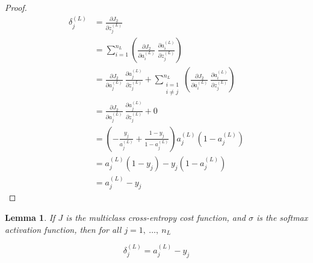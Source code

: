 \documentclass{article}[11pt]
\newtheorem{lemma}{Lemma}
\begin{document}
\begin{proof}
            $$ \begin{aligned}
            \delta^{(L)}_j &= \frac{\partial J_2}{\partial z^{(L)}_j} \\
            &= \sum_{i=1}^{n_L} \left( \frac{\partial J_2}{\partial a^{(L)}_i} \ \frac{\partial a^{(L)}_i}{\partial z^{(L)}_j} \right) \\
            &= \frac{\partial J_2}{\partial a^{(L)}_j} \ \frac{\partial a^{(L)}_j}{\partial z^{(L)}_j} + \sum_{\substack{i=1 \\ i \neq j}}^{n_L} \left( \frac{\partial J_2}{\partial a^{(L)}_i} \ \frac{\partial a^{(L)}_i}{\partial z^{(L)}_j} \right) \\
            &= \frac{\partial J_2}{\partial a^{(L)}_j} \ \frac{\partial a^{(L)}_j}{\partial z^{(L)}_j} + 0 \\
            &= \left( - \frac{y_j}{a^{(L)}_j} + \frac{1 - y_j}{1 - a^{(L)}_j} \right) a^{(L)}_j \left( 1 - a^{(L)}_j \right) \\
            &= a^{(L)}_j (1 - y_j) - y_j (1 - a^{(L)}_j) \\
            &= a^{(L)}_j - y_j
            \end{aligned} $$
            
        \end{proof}

        
        \begin{lemma}
            
            If $J$ is the multiclass cross-entropy cost function, and $\sigma$ is the softmax activation function, then for all $j = 1, \ \ldots, \ n_L$
            
            $$
            \delta^{(L)}_j = a^{(L)}_j - y_j
            $$
            
        \end{lemma}
        
\end{document}
